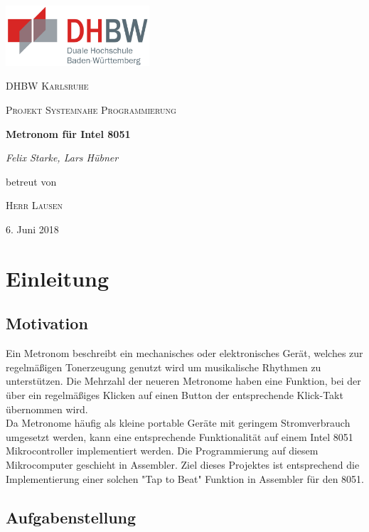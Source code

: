 \documentclass[a4paper, 10pt]{scrartcl}
\title{\titel}
\author{\autoren}
\date{\datum}
\def \autoren {Felix Starke, Lars Hübner}
\def \titel {Metronom für Intel 8051}
\def \arbeit {Projekt Systemnahe Programmierung}
\def \uni {DHBW Karlsruhe}
\def \betreuer {Herr Lausen}
\def \datum {6. Juni 2018}
\begin{document}
\begin{titlepage}
	\centering
	\includegraphics[width=0.4\textwidth]{dhbw.png}\par\vspace{1cm}
	{\scshape\LARGE \uni \par}
	\vspace{1cm}
	{\scshape\Large \arbeit\par}
	\vspace{1.5cm}
	{\huge\bfseries \titel\par}
	\vspace{2cm}
	{\Large\itshape \autoren\par}
	\vfill
	betreut von\par
	\textsc{\betreuer}

	\vfill

	{\large \datum\par}
\end{titlepage}

\newpage
\tableofcontents
\newpage

\section{Einleitung}
\subsection{Motivation}
Ein Metronom beschreibt ein mechanisches oder elektronisches Gerät, welches zur regelmäßigen Tonerzeugung genutzt wird um musikalische Rhythmen zu unterstützen. Die Mehrzahl der neueren Metronome haben eine Funktion, bei der über ein regelmäßiges Klicken auf einen Button der entsprechende Klick-Takt übernommen wird.
\\
Da Metronome häufig als kleine portable Geräte mit geringem Stromverbrauch umgesetzt werden, kann eine entsprechende Funktionalität auf einem Intel 8051 Mikrocontroller implementiert werden. Die Programmierung auf diesem Mikrocomputer geschieht in Assembler. Ziel dieses Projektes ist entsprechend die Implementierung einer solchen "Tap to Beat" Funktion in Assembler für den 8051.

\subsection{Aufgabenstellung}
\end{document}
